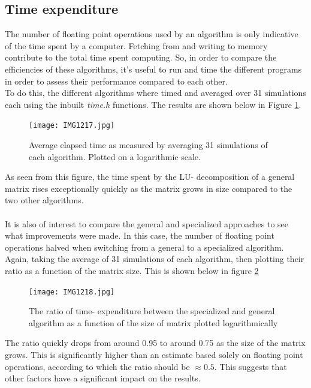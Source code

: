 \documentclass[10pt,a4paper]{article}
\begin{document}
\subsection{Time expenditure}
The number of floating point operations used by an algorithm is only indicative of the time spent by a computer. Fetching from and writing to memory contribute to the total time spent computing. So, in order to compare the efficiencies of these algorithms, it's useful to run and time the different programs in order to assess their performance compared to each other.\\To do this, the different algorithms where timed and averaged over 31 simulations each using the inbuilt \emph{time.h} functions. The results are shown below in Figure \ref{Figure 2}.
\begin{center}
\begin{figure}[H]
\texttt{[image: IMG1217.jpg]} \label{Elapsed time comparison}
	\caption[Comparing elapsed time]{Average elapsed time as measured by averaging 31 simulations of each algorithm. Plotted on a logarithmic scale.}
	\label{Figure 2}
\end{figure}
\end{center}
As seen from this figure, the time spent by the LU- decomposition of a general matrix rises exceptionally quickly as the matrix grows in size compared to the two other algorithms.\\\\It is also of interest to compare the general and specialized approaches to see what improvements were made. In this case, the number of floating point operations halved when switching from a general to a specialized algorithm. Again, taking the average of 31 simulations of each algorithm, then plotting their ratio as a function of the matrix size. This is shown below in figure \ref{Figure 3}
\begin{center}
\begin{figure}[H]
	\texttt{[image: IMG1218.jpg]}
	\caption[Comparing general and specialized (elapsed time)]{The ratio of time- expenditure between the specialized and general algorithm as a function of the size of matrix plotted logarithmically}
	\label{Figure 3}
\end{figure}
\end{center}
The ratio quickly drops from around 0.95 to around 0.75 as the size of the matrix grows. This is significantly higher than an estimate based solely on floating point operations, according to which the ratio should be $\approx0.5
$. This suggests that other factors have a significant impact on the results.
\end{document}
